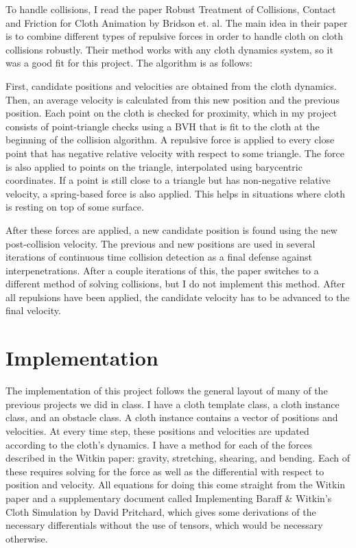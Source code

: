 \documentclass[12pt]{article} %
\begin{document}
To handle collisions, I read the paper Robust Treatment of Collisions, Contact and Friction for Cloth Animation by Bridson et. al. The main idea in their paper is to combine different types of repulsive forces in order to handle cloth on cloth collisions robustly. Their method works with any cloth dynamics system, so it was a good fit for this project. The algorithm is as follows:

First, candidate positions and velocities are obtained from the cloth dynamics. Then, an average velocity is calculated from this new position and the previous position. Each point on the cloth is checked for proximity, which in my project consists of point-triangle checks using a BVH that is fit to the cloth at the beginning of the collision algorithm. A repulsive force is applied to every close point that has negative relative velocity with respect to some triangle. The force is also applied to points on the triangle, interpolated using barycentric coordinates. If a point is still close to a triangle but has non-negative relative velocity, a spring-based force is also applied. This helps in situations where cloth is resting on top of some surface.

After these forces are applied, a new candidate position is found using the new post-collision velocity. The previous and new positions are used in several iterations of continuous time collision detection as a final defense against interpenetrations. After a couple iterations of this, the paper switches to a different method of solving collisions, but I do not implement this method. After all repulsions have been applied, the candidate velocity has to be advanced to the final velocity.

\section{Implementation}
The implementation of this project follows the general layout of many of the previous projects we did in class. I have a cloth template class, a cloth instance class, and an obstacle class. A cloth instance contains a vector of positions and velocities. At every time step, these positions and velocities are updated according to the cloth’s dynamics. I have a method for each of the forces described in the Witkin paper: gravity, stretching, shearing, and bending. Each of these requires solving for the force as well as the differential with respect to position and velocity. All equations for doing this come straight from the Witkin paper and a supplementary document called Implementing Baraff \& Witkin’s Cloth Simulation by David Pritchard, which gives some derivations of the necessary differentials without the use of tensors, which would be necessary otherwise.
\end{document}
